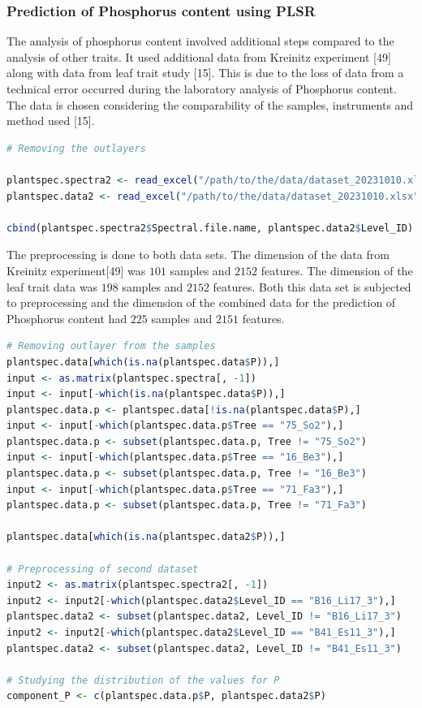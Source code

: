 \documentclass[12pt,a4paper]{report}
\begin{document}
\subsubsection*{Prediction of Phosphorus content using PLSR}
The analysis of phosphorus content involved additional steps compared to the analysis of other traits. It used additional data from Kreinitz experiment [49] along with data from leaf trait study [15]. This is due to the loss of data from a technical error occurred during the laboratory analysis of Phosphorus content. The data is chosen considering the comparability of the samples, instruments and method used [15]. \\

\begin{lstlisting}[language=R, style=mystyle]
# Removing the outlayers

plantspec.spectra2 <- read_excel("/path/to/the/data/dataset_20231010.xlsx", sheet = "Kreinitz set spectra") # Spectral Kreinitz set
plantspec.data2 <- read_excel("/path/to/the/data/dataset_20231010.xlsx", sheet = "Kreinitz set traits") # Traits Kreinitz set

cbind(plantspec.spectra2$Spectral.file.name, plantspec.data2$Level_ID) # Checking correlation between both sets
\end{lstlisting}

The preprocessing is done to both data sets. The dimension of the data from Kreinitz experiment[49] was $101$ samples and $2152$ features. The dimension of the leaf trait data was $198$ samples and $2152$ features. Both this data set is subjected to preprocessing and the dimension of the combined data for the prediction of Phosphorus content had $225$ samples and $2151$ features.  \\

\begin{lstlisting}[language=R, style=mystyle]
# Removing outlayer from the samples
plantspec.data[which(is.na(plantspec.data$P)),]
input <- as.matrix(plantspec.spectra[, -1])
input <- input[-which(is.na(plantspec.data$P)),]
plantspec.data.p <- plantspec.data[!is.na(plantspec.data$P),]
input <- input[-which(plantspec.data.p$Tree == "75_So2"),]
plantspec.data.p <- subset(plantspec.data.p, Tree != "75_So2")
input <- input[-which(plantspec.data.p$Tree == "16_Be3"),]
plantspec.data.p <- subset(plantspec.data.p, Tree != "16_Be3")
input <- input[-which(plantspec.data.p$Tree == "71_Fa3"),]
plantspec.data.p <- subset(plantspec.data.p, Tree != "71_Fa3")

plantspec.data[which(is.na(plantspec.data2$P)),]

# Preprocessing of second dataset
input2 <- as.matrix(plantspec.spectra2[, -1])
input2 <- input2[-which(plantspec.data2$Level_ID == "B16_Li17_3"),]
plantspec.data2 <- subset(plantspec.data2, Level_ID != "B16_Li17_3")
input2 <- input2[-which(plantspec.data2$Level_ID == "B41_Es11_3"),]
plantspec.data2 <- subset(plantspec.data2, Level_ID != "B41_Es11_3")

# Studying the distribution of the values for P
component_P <- c(plantspec.data.p$P, plantspec.data2$P)
\end{lstlisting}
\end{document}
